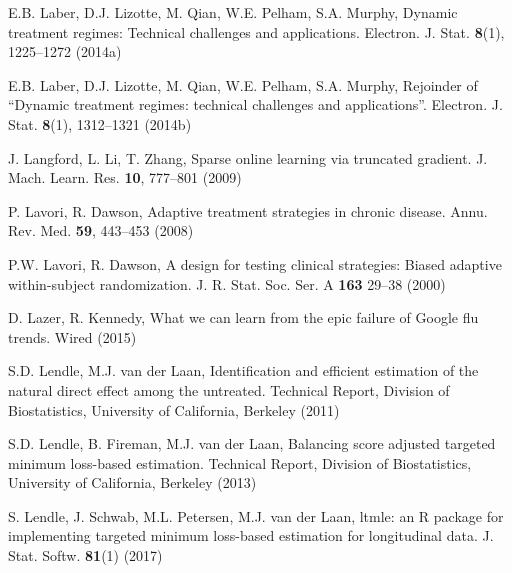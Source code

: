 \begin{list}{}{\setlength{\leftmargin}{2.1em}\setlength{\labelwidth}{0pt}
  \setlength{\labelsep}{0pt}\setlength{\itemindent}{-2.1em}
  \setlength{\parsep}{0pt}\setlength{\itemsep}{2pt}\setlength{\topsep}{0pt}}
\item\label{refentry:REF193}E.B. Laber, D.J. Lizotte, M. Qian, W.E. Pelham, S.A. Murphy, Dynamic treatment regimes: Technical challenges and applications. Electron. J. Stat. \textbf{8}(1), 1225--1272 (2014a)\label{refend:REF193}
\item\label{refentry:REF194}E.B. Laber, D.J. Lizotte, M. Qian, W.E. Pelham, S.A. Murphy, Rejoinder of ``Dynamic treatment regimes: technical challenges and applications''. Electron. J. Stat. \textbf{8}(1), 1312--1321 (2014b)\label{refend:REF194}
\item\label{refentry:REF195}J. Langford, L. Li, T. Zhang, Sparse online learning via truncated gradient. J. Mach. Learn. Res. \textbf{10}, 777--801 (2009)\label{refend:REF195}
\item\label{refentry:REF196}P. Lavori, R. Dawson, Adaptive treatment strategies in chronic disease. Annu. Rev. Med. \textbf{59}, 443--453 (2008)\label{refend:REF196}
\item\label{refentry:REF197}P.W. Lavori, R. Dawson, A design for testing clinical strategies: Biased adaptive within-subject randomization. J. R. Stat. Soc. Ser. A \textbf{163} 29--38 (2000)\label{refend:REF197}
\item\label{refentry:REF198}D. Lazer, R. Kennedy, What we can learn from the epic failure of Google flu trends. Wired (2015)\label{refend:REF198}
\item\label{refentry:REF199}S.D. Lendle, M.J. van der Laan, Identification and efficient estimation of the natural direct effect among the untreated. Technical Report, Division of Biostatistics, University of California, Berkeley (2011)\label{refend:REF199}
\item\label{refentry:REF200}S.D. Lendle, B. Fireman, M.J. van der Laan, Balancing score adjusted targeted minimum loss-based estimation. Technical Report, Division of Biostatistics, University of California, Berkeley (2013)\label{refend:REF200}
\item\label{refentry:REF201}S. Lendle, J. Schwab, M.L. Petersen, M.J. van der Laan, ltmle: an R package for implementing targeted minimum loss-based estimation for longitudinal data. J. Stat. Softw. \textbf{81}(1) (2017)\label{refend:REF201}

\end{list}

